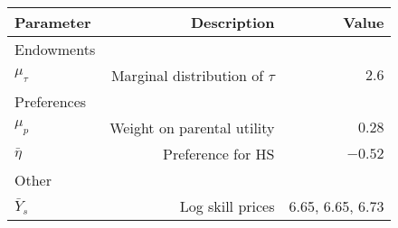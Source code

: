 \begin{tabular}{lrr}
\hline
Parameter & Description  & Value  \\ 
\hline
Endowments &   &   \\ 
$\mu_{\tau}$ & Marginal distribution of $\tau$  & $2.6$  \\ 
Preferences &   &   \\ 
$\mu_{p}$ & Weight on parental utility  & $0.28$  \\ 
$\bar{\eta}$ & Preference for HS  & $-0.52$  \\ 
Other &   &   \\ 
$\bar{Y}_{s}$ & Log skill prices  & 6.65, 6.65, 6.73  \\ 
\hline
\end{tabular}%
